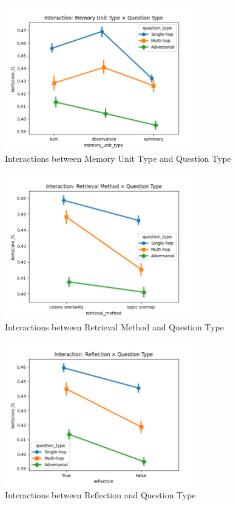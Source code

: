 \begin{figure}[htbp]
\centering
\includegraphics[width=0.75\textwidth]{charts/interaction_memory_unit_type_x_question_type.png}
\caption{Interactions between Memory Unit Type and Question Type}
\label{fig:interaction_memory_unit_type_x_question_type}
\end{figure}

\begin{figure}[htbp]
\centering
\includegraphics[width=0.75\textwidth]{charts/interaction_retrieval_method_x_question_type.png}
\caption{Interactions between Retrieval Method and Question Type}
\label{fig:interaction_retrieval_method_x_question_type}
\end{figure}

\vspace*{0cm}
\begin{figure}[H]
\centering
\includegraphics[width=0.75\textwidth]{charts/interaction_reflection_x_question_type.png}
\caption{Interactions between Reflection and Question Type}
\label{fig:interaction_reflection_x_question_type}
\end{figure}

\clearpage

